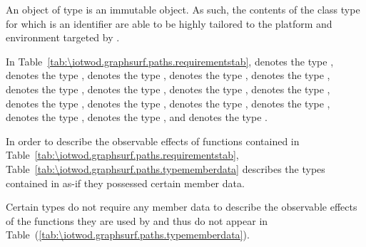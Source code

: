 \pnum
\begin{note}
An object of type  is an immutable object. As such, the contents of the class type for which  is an identifier are able to be highly tailored to the platform and environment targeted by .
\end{note}

\pnum
In Table~\ref{tab:\iotwod.graphsurf.paths.requirementstab},
 denotes the type ,  denotes the type ,
 denotes the type ,
 denotes the type ,
 denotes the type ,
 denotes the type ,
 denotes the type ,
 denotes the type ,
 denotes the type ,
 denotes the type ,
 denotes the type ,
 denotes the type ,
 denotes the type ,
 denotes the type ,
 denotes the type , and
 denotes the type .

\pnum
In order to describe the observable effects of functions contained in Table~\ref{tab:\iotwod.graphsurf.paths.requirementstab}, Table~\ref{tab:\iotwod.graphsurf.paths.typememberdata} describes the types contained in  as-if they possessed certain member data. 

\pnum
\begin{note}
Certain types do not require any member data to describe the observable effects of the functions they are used by and thus do not appear in Table~(\ref{tab:\iotwod.graphsurf.paths.typememberdata}).
\end{note}

